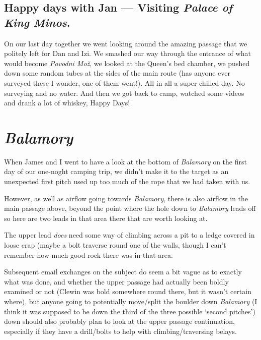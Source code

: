 

\subsection{\texorpdfstring{Happy days with Jan --- Visiting
\emph{Palace of King
Minos}.}{Happy days with Jan --- Visiting Palace of King Minos.}}

On our last day together we went looking around the amazing passage that
we politely left for Dan and Izi. We smashed our way through the
entrance of what would become \emph{Povodni Mo\v{z}}, we looked at the
Queen's bed chamber, we pushed down some random tubes at the sides of
the main route (has anyone ever surveyed these I wonder, one of them
went!). All in all a super chilled day. No surveying and no water. And
then we got back to camp, watched some videos and drank a lot of
whiskey, Happy Days!



\section{\texorpdfstring{\emph{Balamory}}{Balamory}}

When James and I went to have a look at the bottom of \emph{Balamory} on
the first day of our one-noght camping trip, we didn't make it to the
target as an unexpected first pitch used up too much of the rope that we
had taken with us.

However, as well as airflow going towards \emph{Balamory}, there is also
airflow in the main passage above, beyond the point where the hole down
to \emph{Balamory} leads off so here are two leads in that area there
that are worth looking at.

The upper lead \emph{does} need some way of climbing across a pit to a
ledge covered in loose crap (maybe a bolt traverse round one of the
walls, though I can't remember how much good rock there was in that
area.

Subsequent email exchanges on the subject do seem a bit vague as to
exactly what was done, and whether the upper passage had actually been
boldly examined or not (Clewin was bold somewhere round there, but it
wasn't certain where), but anyone going to potentially move/split the
boulder down \emph{Balamory} (I think it was supposed to be down the
third of the three possible `second pitches') down should also probably
plan to look at the upper passage continuation, especially if they have
a drill/bolts to help with climbing/traversing belays.

